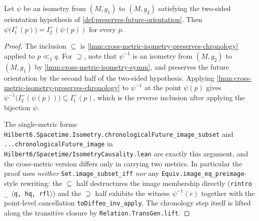 \begin{lemma}
    \label{lmm:cross-metric-chronological-future-image}
    \leanok
    Let $\psi$ be an isometry from $(M,g_1)$ to $(M,g_2)$ satisfying the two-sided orientation hypothesis of \ref{def:preserves-future-orientation}. Then $\psi\big(I^+_1(p)\big) = I^+_2(\psi(p))$ for every $p$.
\end{lemma}
\begin{proof}
    \leanok
    The inclusion $\subseteq$ is \ref{lmm:cross-metric-isometry-preserves-chronology} applied to $p \ll_1 q$. For $\supseteq$, note that $\psi^{-1}$ is an isometry from $(M,g_2)$ to $(M,g_1)$ by \ref{lmm:cross-metric-isometry-symm}, and preserves the future orientation by the second half of the two-sided hypothesis. Applying \ref{lmm:cross-metric-isometry-preserves-chronology} to $\psi^{-1}$ at the point $\psi(p)$ gives $\psi^{-1}\big(I^+_2(\psi(p))\big) \subseteq I^+_1(p)$, which is the reverse inclusion after applying the bijection $\psi$.

    The single-metric forms \texttt{Hilbert6.Spacetime.Isometry.chronologicalFuture\_image\_subset} and \texttt{...chronologicalFuture\_image} in \texttt{Hilbert6/Spacetime/IsometryCausality.lean} are exactly this argument, and the cross-metric version differs only in carrying two metrics. In particular the proof uses \emph{neither} \texttt{Set.image\_subset\_iff} \emph{nor} any \texttt{Equiv.image\_eq\_preimage}-style rewriting: the $\subseteq$ half destructures the image membership directly (\texttt{rintro \_ $\langle$q, hq, rfl$\rangle$}) and the $\supseteq$ half exhibits the witness $\psi^{-1}(r)$ together with the point-level cancellation \texttt{toDiffeo\_inv\_apply}. The chronology step itself is lifted along the transitive closure by \texttt{Relation.TransGen.lift}.
\end{proof}

\medskip

